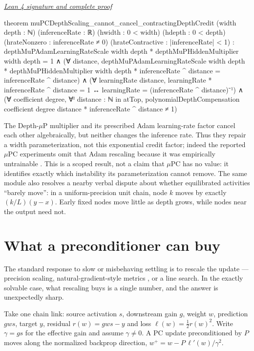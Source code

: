 \documentclass[11pt]{article}
\newcommand{\leancommit}{f3a31db36bb2f944312ee31c1d86c2758109e83a}
\newcommand{\leansignaturelink}[2]{%
  \par\Needspace{0.3\textheight}\smallskip\noindent
  \href{https://github.com/zariuq/MeTTapedia/blob/\leancommit/#1\#L#2}{%
    \scriptsize\itshape Lean 4 signature and complete proof}\par\nobreak}
\begin{document}
\leansignaturelink{lean/mettapedia/Mettapedia/MachineLearning/NeuralNetworks/%
PredictiveCoding/MuPCDepthCredit.lean}{366}
\begin{leansignature}
theorem muPCDepthScaling_cannot_cancel_contractingDepthCredit
    (width depth : ℕ) (inferenceRate : ℝ)
    (hwidth : 0 < width) (hdepth : 0 < depth)
    (hrateNonzero : inferenceRate ≠ 0) (hrateContractive : |inferenceRate| < 1) :
    depthMuPAdamLearningRateScale width depth *
        depthMuPHiddenMultiplier width depth = 1 ∧
      (∀ distance,
        depthMuPAdamLearningRateScale width depth *
            depthMuPHiddenMultiplier width depth *
              inferenceRate ^ distance = inferenceRate ^ distance) ∧
      (∀ learningRate distance,
        learningRate * inferenceRate ^ distance = 1 ↔
          learningRate = (inferenceRate ^ distance)⁻¹) ∧
      (∀ coefficient degree,
        ∀ᶠ distance : ℕ in atTop,
          polynomialDepthCompensation coefficient degree distance *
              inferenceRate ^ distance ≠ 1)
\end{leansignature}

The Depth-$\mu$P multiplier and its prescribed Adam learning-rate factor cancel each
other algebraically, but neither changes the inference rate.  Thus they repair a width
parameterization, not this exponential credit factor; indeed the reported $\mu$PC
experiments omit that Adam rescaling because it was empirically untrainable
\cite{innocentimupc2025}.  This is a scoped result, not a claim that $\mu$PC has no value:
it identifies exactly which instability its parameterization cannot remove.  The same
module also resolves a nearby verbal dispute about whether equilibrated activities
``barely move'': in a uniform-precision unit chain, node $k$ moves by exactly
$(k/L)(y-x)$.  Early fixed nodes move little as depth grows, while nodes near the output
need not.

\section{What a preconditioner can buy}
\label{sec:precond}

The standard response to slow or misbehaving settling is to rescale the update ---
precision scaling, natural-gradient-style metrics \cite{ofner2021}, or a line search. In
the exactly solvable case, what rescaling buys is a single number, and the answer is
unexpectedly sharp.

Take one chain link: source activation $s$, downstream gain $g$, weight $w$, prediction
$g w s$, target $y$, residual $r(w) = gws - y$ and loss $\ell(w) = \tfrac12 r(w)^2$.
Write $\gamma = gs$ for the effective gain and assume $\gamma \neq 0$. A PC update
preconditioned by $P$ moves along the normalized backprop direction,
$w^+ = w - P\,\ell'(w)/\gamma^2$.
\end{document}

